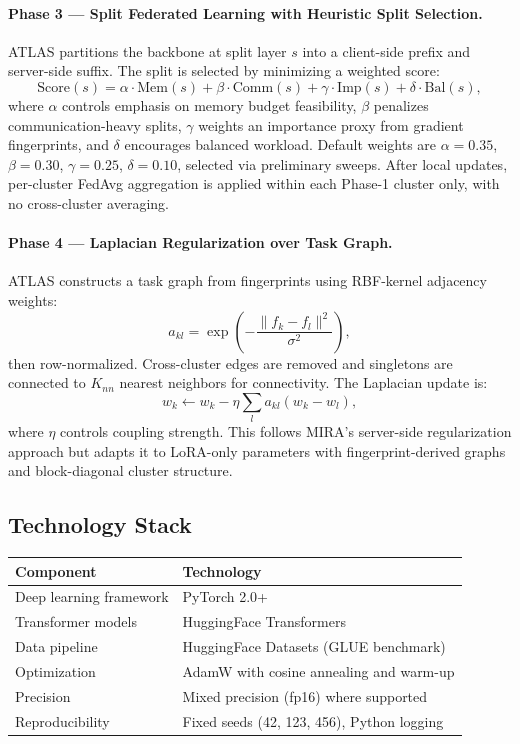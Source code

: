 \documentclass[11pt,a4paper]{article}
\begin{document}
\paragraph{Phase 3 --- Split Federated Learning with Heuristic Split Selection.}
ATLAS partitions the backbone at split layer $s$ into a client-side prefix and server-side suffix. The split is selected by minimizing a weighted score:
\[
\mathrm{Score}(s) = \alpha\cdot\mathrm{Mem}(s) + \beta\cdot\mathrm{Comm}(s) + \gamma\cdot\mathrm{Imp}(s) + \delta\cdot\mathrm{Bal}(s),
\]
where $\alpha$ controls emphasis on memory budget feasibility, $\beta$ penalizes communication-heavy splits, $\gamma$ weights an importance proxy from gradient fingerprints, and $\delta$ encourages balanced workload. Default weights are $\alpha=0.35$, $\beta=0.30$, $\gamma=0.25$, $\delta=0.10$, selected via preliminary sweeps. After local updates, per-cluster FedAvg aggregation is applied within each Phase-1 cluster only, with no cross-cluster averaging.

\paragraph{Phase 4 --- Laplacian Regularization over Task Graph.}
ATLAS constructs a task graph from fingerprints using RBF-kernel adjacency weights:
\[
a_{kl} = \exp\left(-\frac{\lVert f_k - f_l\rVert^2}{\sigma^2}\right),
\]
then row-normalized. Cross-cluster edges are removed and singletons are connected to $K_{nn}$ nearest neighbors for connectivity. The Laplacian update is:
\[
w_k \leftarrow w_k - \eta \sum_l a_{kl}(w_k - w_l),
\]
where $\eta$ controls coupling strength. This follows MIRA's server-side regularization approach but adapts it to LoRA-only parameters with fingerprint-derived graphs and block-diagonal cluster structure.

\subsection{Technology Stack}

\begin{center}
\begin{tabular}{ll}
\toprule
\textbf{Component} & \textbf{Technology}\\
\midrule
Deep learning framework & PyTorch 2.0+\\
Transformer models & HuggingFace Transformers\\
Data pipeline & HuggingFace Datasets (GLUE benchmark)\\
Optimization & AdamW with cosine annealing and warm-up\\
Precision & Mixed precision (fp16) where supported\\
Reproducibility & Fixed seeds (42, 123, 456), Python logging\\
\bottomrule
\end{tabular}
\end{center}
\end{document}

